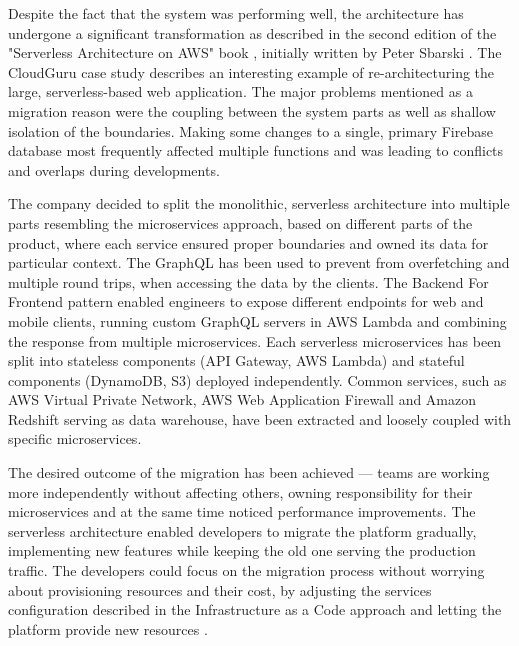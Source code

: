Despite the fact that the system was performing well, the architecture has undergone a significant transformation as described in the second edition of the "Serverless Architecture on AWS" book \cite{ServerlessArchitectureOnAWSSecondEdition}, initially written by Peter Sbarski \cite{ServerlessArchitectureOnAWS}.
The CloudGuru case study describes an interesting example of re-architecturing the large, serverless-based web application.
The major problems mentioned as a migration reason were the coupling between the system parts as well as shallow isolation of the boundaries.
Making some changes to a single, primary Firebase database most frequently affected multiple functions and was leading to conflicts and overlaps during developments.

The company decided to split the monolithic, serverless architecture into multiple parts resembling the microservices approach, based on different parts of the product, where each service ensured proper boundaries and owned its data for particular context.
The GraphQL has been used to prevent from overfetching and multiple round trips, when accessing the data by the clients.
The Backend For Frontend pattern enabled engineers to expose different endpoints for web and mobile clients, running custom GraphQL servers in AWS Lambda and combining the response from multiple microservices.
Each serverless microservices has been split into stateless components (API Gateway, AWS Lambda) and stateful components (DynamoDB, S3) deployed independently.
Common services, such as AWS Virtual Private Network, AWS Web Application Firewall and Amazon Redshift serving as data warehouse, have been extracted and loosely coupled with specific microservices.

The desired outcome of the migration has been achieved --- teams are working more independently without affecting others, owning responsibility for their microservices and at the same time noticed performance improvements.
The serverless architecture enabled developers to migrate the platform gradually, implementing new features while keeping the old one serving the production traffic.
The developers could focus on the migration process without worrying about provisioning resources and their cost, by adjusting the services configuration described in the Infrastructure as a Code approach and letting the platform provide new resources \cite{ServerlessArchitectureOnAWS}.




